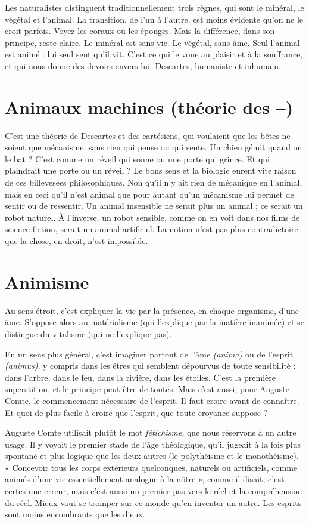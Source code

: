 Les naturalistes distinguent traditionnellement trois règnes, qui sont le
minéral, le végétal et l'animal. La transition, de l’un à l’autre, est moins évidente
qu’on ne le croit parfois. Voyez les coraux ou les éponges. Mais la différence,
dans son principe, reste claire. Le minéral est sans vie. Le végétal, sans
âme. Seul l'animal est animé : lui seul sent qu’il vit. C’est ce qui le voue au
plaisir et à la souffrance, et qui nous donne des devoirs envers lui. Descartes,
humaniste et inhumain.

\section{Animaux machines (théorie des {\bf --})}
C'est une théorie de Descartes
et des cartésiens, qui voulaient
que les bêtes ne soient que mécanisme, sans rien qui pense ou qui sente. Un
chien gémit quand on le bat ? C’est comme un réveil qui sonne ou une porte
qui grince. Et qui plaindrait une porte ou un réveil ? Le bons sens et la biologie
eurent vite raison de ces billevesées philosophiques. Non qu’il n’y ait
rien de mécanique en l’animal, mais en ceci qu’il n’est animal que pour
autant qu'un mécanisme lui permet de sentir ou de ressentir. Un animal
insensible ne serait plus un animal ; ce serait un robot naturel. À l'inverse, un
robot sensible, comme on en voit dans nos films de science-fiction, serait un
animal artificiel. La notion n’est pas plus contradictoire que la chose, en
droit, n’est impossible.

\section{Animisme}
Au sens étroit, c’est expliquer la vie par la présence, en chaque
organisme, d’une âme. S’oppose alors au matérialisme (qui
l'explique par la matière inanimée) et se distingue du vitalisme (qui ne
l'explique pas).

En un sens plus général, c’est imaginer partout de l’âme {\it (anima)} ou de
l'esprit {\it (animus)}, y compris dans les êtres qui semblent dépourvus de toute
sensibilité : dans l'arbre, dans le feu, dans la rivière, dans les étoiles. C’est la
première superstition, et le principe peut-être de toutes. Mais c’est aussi, pour
Auguste Comte, le commencement nécessaire de l'esprit. Il faut croire avant de
connaître. Et quoi de plus facile à croire que l'esprit, que toute croyance
suppose ?

Auguste Comte utilisait plutôt le mot {\it fétichisme}, que nous réservons à
un autre usage. Il y voyait le premier stade de l’âge théologique, qu’il jugeait
à la fois plus spontané et plus logique que les deux autres (le polythéisme et
le monothéisme). « Concevoir tous les corps extérieurs quelconques, naturels
ou artificiels, comme animés d’une vie essentiellement analogue à la
nôtre », comme il disait, c’est certes une erreur, mais c’est aussi un premier
pas vers le réel et la compréhension du réel. Mieux vaut se tromper sur ce
monde qu’en inventer un autre. Les esprits sont moins encombrants que les
dieux.

